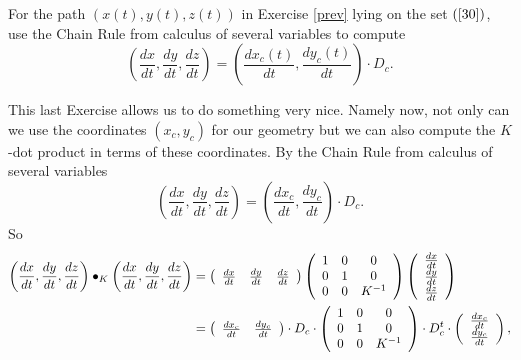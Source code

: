 \documentclass{ximera}
\begin{document}
\begin{exercise}
For the path $\left(  x\left(  t\right)  ,y\left(  t\right)  ,z\left(
t\right)  \right)  $ in Exercise \ref{prev} lying on the set $\left(
\ref{30}\right)  $, use the Chain Rule from calculus of several variables to
compute%
\[
\left(  \frac{dx}{dt},\frac{dy}{dt},\frac{dz}{dt}\right)  =\left(
\frac{dx_{c}\left(  t\right)  }{dt},\frac{dy_{c}\left(  t\right)  }%
{dt}\right)  \cdot D_{c}.
\]

\end{exercise}

This last Exercise allows us to do something very nice. Namely now, not only
can we use the coordinates $\left(  x_{c},y_{c}\right)  $ for our geometry but
we can also compute the $K$-dot product in terms of these coordinates. By the
Chain Rule from calculus of several variables%
\[
\left(  \frac{dx}{dt},\frac{dy}{dt},\frac{dz}{dt}\right)  =\left(
\frac{dx_{c}}{dt},\frac{dy_{c}}{dt}\right)  \cdot D_{c}.
\]
So%
\begin{align*}
\left(  \frac{dx}{dt},\frac{dy}{dt},\frac{dz}{dt}\right)  \bullet_{K}\left(
\frac{dx}{dt},\frac{dy}{dt},\frac{dz}{dt}\right)   &  =\left(
\begin{array}
[c]{ccc}%
\frac{dx}{dt} & \frac{dy}{dt} & \frac{dz}{dt}%
\end{array}
\right)  \left(
\begin{array}
[c]{ccc}%
1 & 0 & 0\\
0 & 1 & 0\\
0 & 0 & K^{-1}%
\end{array}
\right)  \left(
\begin{array}
[c]{c}%
\frac{dx}{dt}\\
\frac{dy}{dt}\\
\frac{dz}{dt}%
\end{array}
\right) \\
&  =\left(
\begin{array}
[c]{cc}%
\frac{dx_{c}}{dt} & \frac{dy_{c}}{dt}%
\end{array}
\right)  \cdot D_{c}\cdot\left(
\begin{array}
[c]{ccc}%
1 & 0 & 0\\
0 & 1 & 0\\
0 & 0 & K^{-1}%
\end{array}
\right)  \cdot D_{c}^{t}\cdot\left(
\begin{array}
[c]{c}%
\frac{dx_{c}}{dt}\\
\frac{dy_{c}}{dt}%
\end{array}
\right)  ,
\end{align*}
\end{document}
